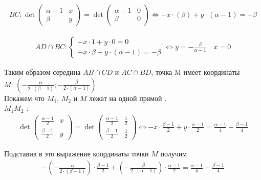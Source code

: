 		\begin{gather*}
		BC:
		\det
		\begin{pmatrix}
			\alpha - 1 & x\\ 
			\beta & y
		\end{pmatrix}
		= \det
		\begin{pmatrix}
			\alpha - 1 & 0\\ 
			\beta & 0
		\end{pmatrix}
		\Leftrightarrow -x \cdot (\beta) + y \cdot (\alpha - 1) = -\beta 
		\end{gather*}
		
		\begin{gather*}
		AD\cap BC:
			\begin{cases}
			-x \cdot 1 + y \cdot 0 = 0\\ 
			-x \cdot \beta + y \cdot (\alpha - 1) = -\beta 
			\end{cases}
		\Leftrightarrow y = -\frac{\beta}{\alpha-1} \quad x = 0 
		\end{gather*}
		
		Таким образом середина $AB\cap CD$ и $AC\cap BD$, точка M имеет координаты\\
		$M$:
		$(-\frac{\alpha}{2 \cdot (\beta - 1)}; -\frac{\beta}{2 \cdot (\alpha - 1)}) $\\
		
		Покажем что $M_1$, $M_2$ и $M$ лежат на одной прямой .\\ 
		$M_1 M_2$ :
		\begin{gather*} 
		\det
		\begin{pmatrix}
			\frac{\alpha - 1}{2} & x\\ 
			\frac{\beta - 1}{2} & y
		\end{pmatrix}
		= \det
		\begin{pmatrix}
			\frac{\alpha - 1}{2} & \frac{1}{2}\\ 
			\frac{\beta - 1}{2} & \frac{1}{2}
		\end{pmatrix}		
		\Leftrightarrow
		-x \cdot \frac{\beta - 1}{2} + y \cdot \frac{\alpha - 1}{2} = \frac{\alpha - 1}{4} - \frac{\beta - 1}{4} 
		\end{gather*}
		
		Подставив в это выражение координаты точки $M$ получим 
		\begin{gather*} 
		-(-\frac{\alpha}{2 \cdot (\beta - 1)}) \cdot \frac{\beta - 1}{2} + (-\frac{\beta}{2 \cdot (\alpha - 1)}) \cdot \frac{\alpha - 1}{2} = \frac{\alpha - 1}{4} - \frac{\beta - 1}{4} 
		\end{gather*}


